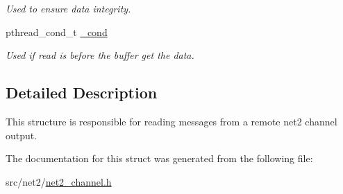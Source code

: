 \begin{DoxyCompactItemize}
\begin{DoxyCompactList}\small\item\em Used to ensure data integrity. \end{DoxyCompactList}\item 
\hypertarget{structnet2__channel__input__t_a1cd9ede6cdabb64e0381fa2eea57f71d}{pthread\-\_\-cond\-\_\-t \hyperlink{structnet2__channel__input__t_a1cd9ede6cdabb64e0381fa2eea57f71d}{\-\_\-cond}}\label{structnet2__channel__input__t_a1cd9ede6cdabb64e0381fa2eea57f71d}

\begin{DoxyCompactList}\small\item\em Used if read is before the buffer get the data. \end{DoxyCompactList}\end{DoxyCompactItemize}


\subsection{Detailed Description}
This structure is responsible for reading messages from a remote net2 channel output. 

The documentation for this struct was generated from the following file\-:\begin{DoxyCompactItemize}
\item 
src/net2/\hyperlink{net2__channel_8h}{net2\-\_\-channel.\-h}\end{DoxyCompactItemize}
